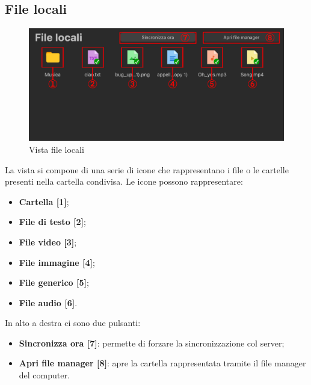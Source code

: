 \subsection{File locali}
\label{sec:fileLocali}
\begin{figure}[H]
    \centering
    \includegraphics[scale = 0.9]{components/img/fileLocali.png}
    \caption{Vista file locali}
    \label{fig:fileSync}
\end{figure}
La vista si compone di una serie di icone che rappresentano i file o le cartelle presenti nella cartella condivisa. Le icone possono rappresentare:
\begin{itemize}
\item \textbf{Cartella [1]};\
\item \textbf{File di testo [2]};\
\item \textbf{File video [3]};\
\item \textbf{File immagine [4]};\
\item \textbf{File generico [5]};\
\item \textbf{File audio [6]}.\
\end{itemize}
In alto a destra ci sono due pulsanti:
\begin{itemize}
\item \textbf{Sincronizza ora [7]}: permette di forzare la sincronizzazione col server;\
\item \textbf{Apri file manager [8]}: apre la cartella rappresentata tramite il file manager del computer.\
\end{itemize}


